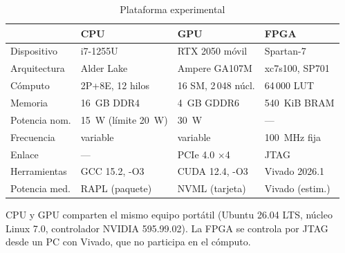 \begin{table}[htbp]
  \caption{Plataforma experimental}
  \label{tab:setup}
  \centering
  \footnotesize
  \setlength{\tabcolsep}{2.6pt}
  \begin{tabular}{@{}llll@{}}
    \toprule
     & \textbf{CPU} & \textbf{GPU} & \textbf{FPGA} \\
    \midrule
    Dispositivo & i7-1255U & RTX 2050 móvil & Spartan-7 \\
    Arquitectura & Alder Lake & Ampere GA107M & xc7s100, SP701 \\
    Cómputo & 2P+8E, 12 hilos & 16 SM, 2\,048 núcl. & 64\,000 LUT \\
    Memoria & 16~GB DDR4 & 4~GB GDDR6 & 540~KiB BRAM \\
    Potencia nom. & 15~W (límite 20~W) & 30~W & --- \\
    Frecuencia & variable & variable & 100~MHz fija \\
    Enlace & --- & PCIe 4.0 $\times$4 & JTAG \\
    Herramientas & GCC 15.2, -O3 & CUDA 12.4, -O3 & Vivado 2026.1 \\
    Potencia med. & RAPL (paquete) & NVML (tarjeta) & Vivado (estim.) \\
    \bottomrule
  \end{tabular}
  \par\vspace{2pt}
  \begin{minipage}{\columnwidth}\footnotesize\raggedright
  CPU y GPU comparten el mismo equipo portátil (Ubuntu 26.04 LTS, núcleo Linux 7.0, controlador NVIDIA 595.99.02). La FPGA se controla por JTAG desde un PC con Vivado, que no participa en el cómputo.
  \end{minipage}
\end{table}
